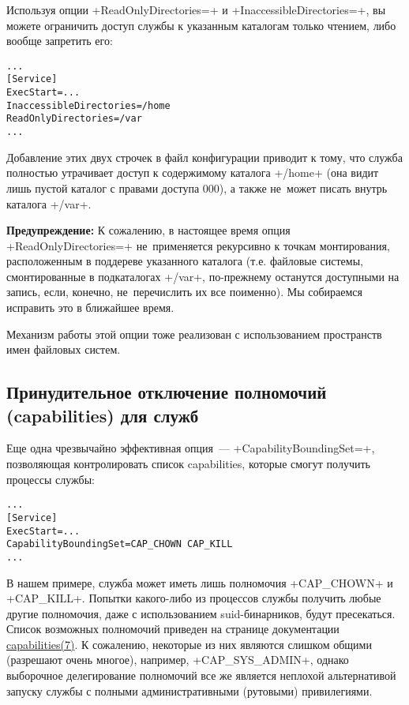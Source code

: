 \documentclass[10pt,oneside,a4paper]{article}
\newenvironment{caveat}[1][]{\smallskip\par\textbf{Предупреждение#1: }}%
	{\smallskip\par}
\begin{document}
Используя опции +ReadOnlyDirectories=+ и +InaccessibleDirectories=+, вы можете
ограничить доступ службы к указанным каталогам только чтением, либо вообще
запретить его:
\begin{Verbatim}
...
[Service]
ExecStart=...
InaccessibleDirectories=/home
ReadOnlyDirectories=/var
...
\end{Verbatim}
Добавление этих двух строчек в файл конфигурации приводит к тому, что служба
полностью утрачивает доступ к содержимому каталога +/home+ (она видит лишь
пустой каталог с правами доступа 000), а также не~может писать внутрь каталога
+/var+.

\begin{caveat}
К сожалению, в настоящее время опция +ReadOnlyDirectories=+ не~применяется
рекурсивно к точкам монтирования, расположенным в поддереве указанного каталога
(т.е. файловые системы, смонтированные в подкаталогах +/var+, по-прежнему
останутся доступными на запись, если, конечно, не~перечислить их все поименно).
Мы собираемся исправить это в ближайшее время.
\end{caveat}

Механизм работы этой опции тоже реализован с использованием пространств имен
файловых систем.

\subsection{Принудительное отключение полномочий (capabilities) для служб}

Еще одна чрезвычайно эффективная опция~--- +CapabilityBoundingSet=+, позволяющая
контролировать список capabilities, которые смогут получить процессы службы:
\begin{Verbatim}
...
[Service]
ExecStart=...
CapabilityBoundingSet=CAP_CHOWN CAP_KILL
...
\end{Verbatim}
В нашем примере, служба может иметь лишь полномочия +CAP_CHOWN+ и +CAP_KILL+.
Попытки какого-либо из процессов службы получить любые другие полномочия, даже с
использованием suid-бинарников, будут пресекаться. Список возможных полномочий
приведен на странице документации
\href{http://linux.die.net/man/7/capabilities}{capabilities(7)}. К сожалению,
некоторые из них являются слишком общими (разрешают очень многое), например,
+CAP_SYS_ADMIN+, однако выборочное делегирование полномочий все же является
неплохой альтернативой запуску службы с полными административными (рутовыми)
привилегиями.
\end{document}
